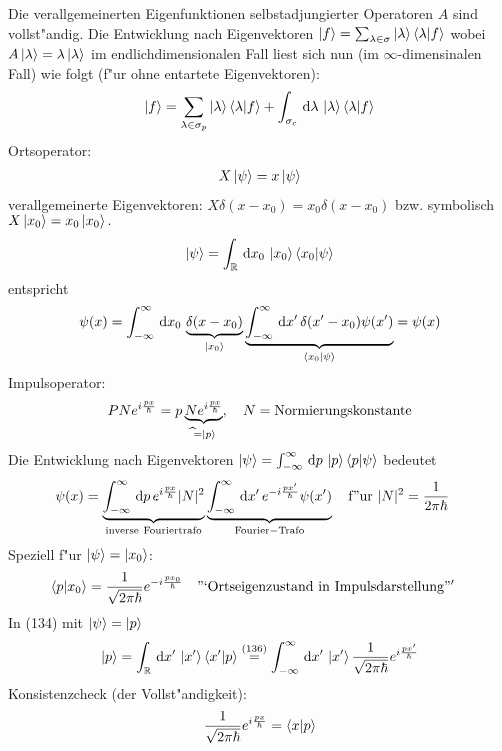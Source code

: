 \documentclass[a4paper]{scrartcl}
\begin{document}
{Die verallgemeinerten Eigenfunktionen selbstadjungierter Operatoren $A$ sind vollst"andig. Die Entwicklung nach Eigenvektoren $ \ket{f} = \sum_{\lambda \in \sigma} \ket{\lambda} \braket{ \lambda | f }$ wobei $A \ket{\lambda} = \lambda \ket \lambda$ im endlichdimensionalen Fall liest sich nun (im $\infty$-dimensinalen Fall) wie folgt (f"ur ohne entartete Eigenvektoren):
\begin{align}
\ket f = \sum_{\lambda \in \sigma_p} \ket \lambda \braket{ \lambda | f} + \int_{\sigma_c} \, \mathrm{d} \lambda \, \ket \lambda \braket{ \lambda | f}
\end{align}
Ortsoperator:
\begin{align} X \ket \psi = x \ket \psi \end{align}
verallgemeinerte Eigenvektoren: $X \delta(x-x_0) = x_0 \delta(x-x_0)$ bzw. symbolisch $X \ket{x_0} = x_0 \ket{x_0}.$
\begin{align}
\ket \psi = \int_\mathbb{R} \, \mathrm{d} x_0 \, \ket {x_0} \braket{ x_0 | \psi}
\end{align}
entspricht
$$ \psi(x) = \int_{-\infty}^\infty \, \mathrm{d} x_0 \, \underbrace{ \delta(x-x_0) }_{\ket{x_0}} \underbrace{\int_{-\infty}^\infty \, \mathrm{d} x' \, \delta(x' - x_0) \psi(x')}_{\braket{ x_0 | \psi}} = \psi(x)$$
Impulsoperator:
$$P  N e^{i \frac {px}{\hbar}} = p \underbrace{ N e^{i \frac{px} \hbar}}_{\widehat \, = \ket p}, \quad N    =  \mathrm{ Normierungskonstante}$$
Die Entwicklung nach Eigenvektoren $\ket \psi = \int_{-\infty}^\infty \, \mathrm{d} p \, \ket p \braket{ p | \psi}$ bedeutet
\begin{align}
\psi(x) & = \underbrace{ \int_{-\infty}^\infty \, \mathrm{d} p \, e^{i \frac {px}\hbar} \vert N \vert^2 }_{\mathrm{inverse \ Fouriertrafo}} \underbrace{ \int_{-\infty}^\infty \, \mathrm{d} x' \,  e^{- i \frac{px'} \hbar} \psi(x') }_{\mathrm{Fourier-Trafo}} \quad \mathrm{f"ur \ } \vert N \vert ^2 = \frac 1 {2 \pi \hbar}
\end{align}
Speziell f"ur $\ket \psi = \ket {x_0}$:
\begin{align}
\braket {p | x_0} & = \frac1{\sqrt{2 \pi \hbar}} e^{- i \frac {p x_0}\hbar} \quad \mathrm{"`Ortseigenzustand \ in \ Impulsdarstellung"'}
\end{align}
In (134) mit $\ket \psi = \ket p$
$$ \ket p = \int_\mathbb{R} \, \mathrm{d} x' \, \ket {x'} \braket{ x' | p} \stackrel{(136)}= \int_{-\infty}^\infty \, \mathrm{d} x' \, \ket{ x'} \frac1{\sqrt{2\pi\hbar}} e^{i \frac{px'}\hbar}$$
Konsistenzcheck (der Vollst"andigkeit):
\begin{align}
\begin{split}
\frac1{\sqrt{2\pi\hbar}} e^{i \frac{px}\hbar} & = \braket{ x | p } \\

\end{split}
\end{align}}
\end{document}
